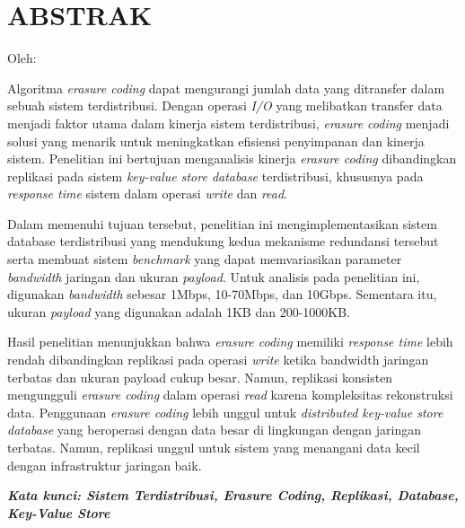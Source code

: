 \clearpage
\chapter*{ABSTRAK}

\begin{center}
	\center
	\begin{singlespace}
		\large\bfseries\MakeUppercase{\thetitle}

		\normalfont\normalsize
		Oleh:

		\bfseries \theauthor
	\end{singlespace}
\end{center}

\begin{singlespace}
	\small
	Algoritma \textit{erasure coding} dapat mengurangi jumlah data yang ditransfer dalam sebuah sistem terdistribusi. Dengan operasi \textit{I/O} yang melibatkan transfer data menjadi faktor utama dalam kinerja sistem terdistribusi, \textit{erasure coding} menjadi solusi yang menarik untuk meningkatkan efisiensi penyimpanan dan kinerja sistem. Penelitian ini bertujuan menganalisis kinerja \textit{erasure coding} dibandingkan replikasi pada sistem \textit{key-value store database} terdistribusi, khususnya pada \textit{response time} sistem dalam operasi \textit{write} dan \textit{read}.

	Dalam memenuhi tujuan tersebut, penelitian ini mengimplementasikan sistem database terdistribusi yang mendukung kedua mekanisme redundansi tersebut serta membuat sistem \textit{benchmark} yang dapat memvariasikan parameter \textit{bandwidth} jaringan dan ukuran \textit{payload}. Untuk analisis pada penelitian ini, digunakan \textit{bandwidth} sebesar 1Mbps, 10-70Mbps, dan 10Gbps. Sementara itu, ukuran \textit{payload} yang digunakan adalah 1KB dan 200-1000KB.

	Hasil penelitian menunjukkan bahwa \textit{erasure coding} memiliki \textit{response time} lebih rendah dibandingkan replikasi pada operasi \textit{write} ketika bandwidth jaringan terbatas dan ukuran payload cukup besar. Namun, replikasi konsisten mengungguli \textit{erasure coding} dalam operasi \textit{read} karena kompleksitas rekonstruksi data. Penggunaan \textit{erasure coding} lebih unggul untuk \textit{distributed key-value store database} yang beroperasi dengan data besar di lingkungan dengan jaringan terbatas. Namun, replikasi unggul untuk sistem yang menangani data kecil dengan infrastruktur jaringan baik.

	\textbf{\textit{Kata kunci: Sistem Terdistribusi, Erasure Coding, Replikasi, Database, Key-Value Store }}

\end{singlespace}
\clearpage